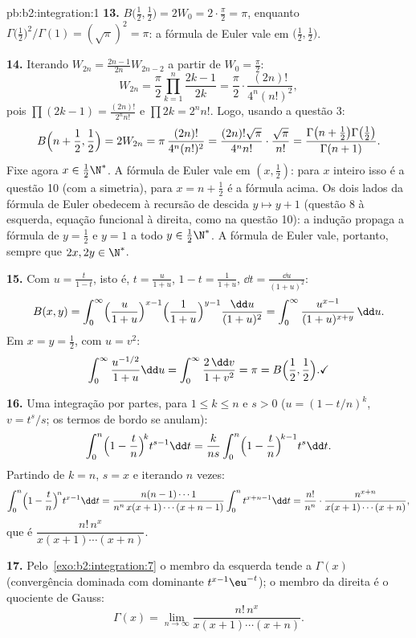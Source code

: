 \begin{solution}{pb:b2:integration:1}
\textbf{13.} $B\bigl(\frac12,\frac12\bigr) = 2W_0 =
2\cdot\frac\pi2 = \pi$, enquanto
$\Gamma\bigl(\frac12\bigr)^2/\Gamma(1) = (\sqrt\pi)^2 = \pi$:
a fórmula de Euler vale em $\bigl(\frac12,\frac12\bigr)$.

\textbf{14.} Iterando $W_{2n} = \frac{2n-1}{2n}W_{2n-2}$ a partir de
$W_0 = \frac\pi2$:
\[
W_{2n} = \frac\pi2\prod_{k=1}^{n}\frac{2k-1}{2k}
= \frac\pi2\cdot\frac{(2n)!}{4^n(n!)^2},
\]
pois $\prod(2k-1) = \frac{(2n)!}{2^n n!}$ e $\prod 2k = 2^n
n!$. Logo, usando a questão 3:
\[
B\Bigl(n+\frac12, \frac12\Bigr) = 2W_{2n}
= \pi\,\frac{(2n)!}{4^n(n!)^2}
= \frac{(2n)!\sqrt\pi}{4^n n!}\cdot\frac{\sqrt\pi}{n!}
= \frac{\Gamma\bigl(n+\frac12\bigr)\Gamma\bigl(\frac12\bigr)}
{\Gamma(n+1)} .
\]
Fixe agora $x \in \frac12\N^*$. A fórmula de Euler vale em $(x,
\frac12)$: para $x$ inteiro isso é a questão 10 (com a simetria),
para $x = n + \frac12$ é a fórmula acima. Os dois lados da
fórmula de Euler obedecem à recursão de descida $y \mapsto y + 1$
(questão 8 à esquerda, equação funcional à direita,
como na questão 10): a indução propaga a fórmula de $y =
\frac12$ e $y = 1$ a todo $y \in \frac12\N^*$. A fórmula de
Euler vale, portanto, sempre que $2x, 2y \in \N^*$.

\textbf{15.} Com $u = \frac{t}{1-t}$, isto é, $t =
\frac{u}{1+u}$, $1 - t = \frac{1}{1+u}$, $\dd t =
\frac{\dd u}{(1+u)^2}$:
\[
B(x,y) = \int_0^\infty
\Bigl(\frac{u}{1+u}\Bigr)^{x-1}
\Bigl(\frac{1}{1+u}\Bigr)^{y-1}
\frac{\dd u}{(1+u)^2}
= \int_0^\infty \frac{u^{x-1}}{(1+u)^{x+y}}\,\dd u .
\]
Em $x = y = \frac12$, com $u = v^2$:
\[
\int_0^\infty \frac{u^{-1/2}}{1+u}\dd u
= \int_0^\infty \frac{2\,\dd v}{1+v^2} = \pi
= B\Bigl(\frac12,\frac12\Bigr) . \checkmark
\]

\textbf{16.} Uma integração por partes, para $1 \leq k \leq n$
e $s > 0$ ($u = (1 - t/n)^k$, $v = t^s/s$; os termos de bordo
se anulam):
\[
\int_0^n \Bigl(1-\frac tn\Bigr)^{\!k} t^{s-1}\dd t
= \frac{k}{ns}\int_0^n \Bigl(1-\frac tn\Bigr)^{\!k-1}
t^{s}\dd t .
\]
Partindo de $k = n$, $s = x$ e iterando $n$ vezes:
\[
\int_0^n \Bigl(1-\frac tn\Bigr)^{\!n} t^{x-1}\dd t
= \frac{n(n-1)\cdots1}{n^n\,x(x+1)\cdots(x+n-1)}
\int_0^n t^{x+n-1}\dd t
= \frac{n!}{n^n}\cdot
\frac{n^{x+n}}{x(x+1)\cdots(x+n)} ,
\]
que é $\dfrac{n!\,n^x}{x(x+1)\cdots(x+n)}$.

\textbf{17.} Pelo~\cref{exo:b2:integration:7} o membro da esquerda tende
a $\Gamma(x)$ (convergência dominada com dominante
$t^{x-1}\eu^{-t}$); o membro da direita é o quociente de Gauss:
\[
\Gamma(x) = \lim_{n\to\infty}
\frac{n!\,n^x}{x(x+1)\cdots(x+n)} .
\]


\end{solution}
